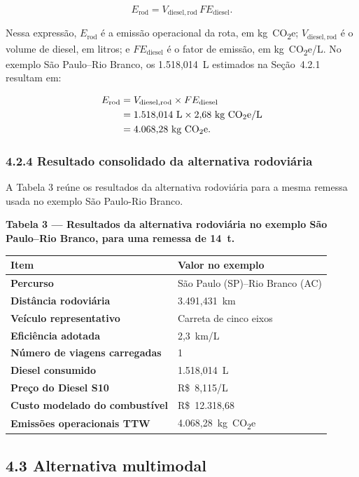 \documentclass[brazil,]{article}
\let\oldsubsection\subsection
\renewcommand{\subsection}{\Needspace{12\baselineskip}\oldsubsection}
\let\oldsubsubsection\subsubsection
\renewcommand{\subsubsection}{\Needspace{10\baselineskip}\oldsubsubsection}
\newcommand{\keeptable}{\Needspace{0.64\textheight}}
\begin{document}
\[
E_{\mathrm{rod}}
=V_{\mathrm{diesel,rod}}\,FE_{\mathrm{diesel}}.
\]

Nessa expressão, \(E_{\mathrm{rod}}\) é a emissão operacional da rota,
em kg~CO\textsubscript{2}e; \(V_{\mathrm{diesel,rod}}\) é o volume de diesel, em litros;
e \(FE_{\mathrm{diesel}}\) é o fator de emissão, em kg~CO\textsubscript{2}e/L. No
exemplo São Paulo--Rio Branco, os 1.518,014~L estimados na Seção~4.2.1
resultam em:

\[
\begin{aligned}
E_{\mathrm{rod}}
&=V_{\mathrm{diesel,rod}}\times FE_{\mathrm{diesel}}\\
&=1.518{,}014\ \mathrm{L}\times2{,}68\ \text{kg CO\textsubscript{2}e/L}\\
&=4.068{,}28\ \text{kg CO\textsubscript{2}e}.
\end{aligned}
\]

\hypertarget{resultado-consolidado-da-alternativa-rodoviuxe1ria}{%
\subsubsection{4.2.4 Resultado consolidado da alternativa
rodoviária}\label{resultado-consolidado-da-alternativa-rodoviuxe1ria}}

A Tabela 3 reúne os resultados da alternativa rodoviária para a mesma
remessa usada no exemplo São Paulo-Rio Branco.

\keeptable
\textbf{Tabela 3 --- Resultados da alternativa rodoviária no exemplo São
Paulo--Rio Branco, para uma remessa de 14~t.}

\begin{longtable}[]{@{}ll@{}}
\toprule
Item & Valor no exemplo\tabularnewline
\midrule
\endhead
\textbf{Percurso} & São Paulo (SP)--Rio Branco (AC)\tabularnewline
\textbf{Distância rodoviária} & 3.491,431~km\tabularnewline
\textbf{Veículo representativo} & Carreta de cinco eixos\tabularnewline
\textbf{Eficiência adotada} & 2,3~km/L\tabularnewline
\textbf{Número de viagens carregadas} & 1\tabularnewline
\textbf{Diesel consumido} & 1.518,014~L\tabularnewline
\textbf{Preço do Diesel S10} & R\$~8,115/L\tabularnewline
\textbf{Custo modelado do combustível} & R\$~12.318,68\tabularnewline
\textbf{Emissões operacionais TTW} & 4.068,28~kg~CO\textsubscript{2}e\tabularnewline
\bottomrule
\end{longtable}

\hypertarget{alternativa-multimodal}{%
\subsection{4.3 Alternativa multimodal}\label{alternativa-multimodal}}
\end{document}
